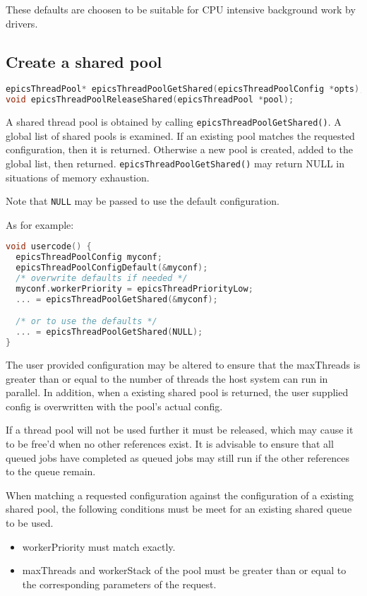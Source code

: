 These defaults are choosen to be suitable for CPU intensive background work by drivers.

\subsection{Create a shared pool}

\begin{lstlisting}[language=C]
epicsThreadPool* epicsThreadPoolGetShared(epicsThreadPoolConfig *opts);
void epicsThreadPoolReleaseShared(epicsThreadPool *pool);
\end{lstlisting}


A shared thread pool is obtained by calling \verb|epicsThreadPoolGetShared()|.
A global list of shared pools is examined. If an existing pool matches
the requested configuration, then it is returned. Otherwise a new
pool is created, added to the global list, then returned. \verb|epicsThreadPoolGetShared()|
may return NULL in situations of memory exhaustion.

Note that \verb|NULL| may be passed to use the default configuration.

As for example:

\begin{lstlisting}[language=C]
void usercode() {
  epicsThreadPoolConfig myconf;
  epicsThreadPoolConfigDefault(&myconf);
  /* overwrite defaults if needed */
  myconf.workerPriority = epicsThreadPriorityLow;
  ... = epicsThreadPoolGetShared(&myconf);

  /* or to use the defaults */
  ... = epicsThreadPoolGetShared(NULL);
}
\end{lstlisting}

The user provided configuration may be altered to ensure that the
maxThreads is greater than or equal to the number of threads the host
system can run in parallel. In addition, when a existing shared pool
is returned, the user supplied config is overwritten with the pool's
actual config.

If a thread pool will not be used further it must be released, which
may cause it to be free'd when no other references exist.
It is advisable to ensure that all queued
jobs have completed as queued jobs may still run if the other references
to the queue remain.

When matching a requested configuration against the configuration
of a existing shared pool, the following conditions must be meet
for an existing shared queue to be used.
\begin{itemize}
\item workerPriority must match exactly.
\item maxThreads and workerStack of the pool must be greater than or equal
to the corresponding parameters of the request.
\end{itemize}

